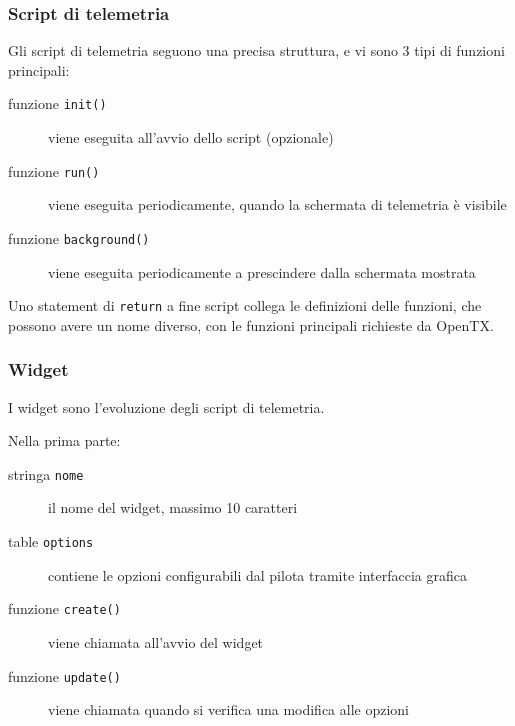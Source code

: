 \documentclass{beamer}
\begin{document}
\begin{frame}
        \frametitle{Script di telemetria}
        Gli script di telemetria seguono una precisa struttura, e vi sono 3 tipi di funzioni principali:
        
        \begin{description}
                \item[funzione \texttt{init()}] viene eseguita all'avvio dello script (opzionale)
                        
                \item[funzione \texttt{run()}] viene eseguita periodicamente, quando la schermata di telemetria è visibile
                        
                \item[funzione \texttt{background()}] viene eseguita periodicamente a prescindere dalla schermata mostrata
                        
        \end{description}
        Uno statement di \texttt{return} a fine script collega le definizioni delle funzioni, che possono avere un nome diverso, con le funzioni principali richieste da OpenTX.
\end{frame}

\begin{frame}
        \frametitle{Widget}
        I widget sono l'evoluzione degli script di telemetria.\newline 
        
        Nella prima parte:
        
        \begin{description}
                \item[stringa \texttt{nome}] il nome del widget, massimo 10 caratteri
                        
                \item[table \texttt{options}] contiene le opzioni configurabili dal pilota tramite interfaccia grafica
                        
                \item[funzione \texttt{create()}] viene chiamata all'avvio del widget
                        
                \item[funzione \texttt{update()}] viene chiamata quando si verifica una modifica alle opzioni
        \end{description}
\end{frame}
\end{document}

